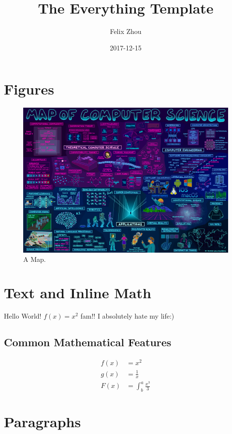 \documentclass{article}
\title{The Everything Template}
\date{2017-12-15}
\author{Felix Zhou}
\begin{document}
\maketitle
\newpage
\tableofcontents
\newpage
{}

\section{Figures}

\begin{figure}[h!]
 \includegraphics[width=\linewidth]{Map.png}
 \caption{A Map.}
 \label{fig:Map of CS}
\end{figure}

\section{Text and Inline Math}

Hello World!
$f(x) = x^2$ fam!!
I absolutely hate my life:)

\subsection{Common Mathematical Features}

\begin{align*}
 f(x) & = x^2                    \\
 g(x) & = \frac{1}{x}            \\
 F(x) & = \int^a_b \frac{x^3}{3}
\end{align*}

\section{Paragraphs}
\end{document}
